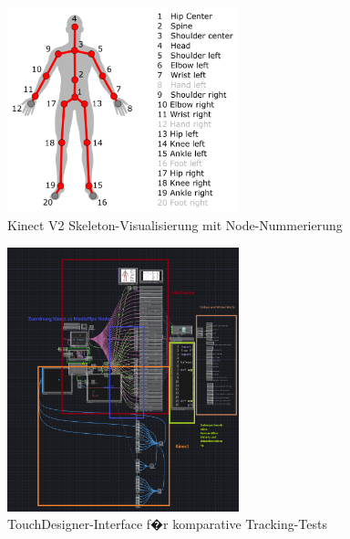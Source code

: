 \begin{figure}[!htbp]
    \centering
    \includegraphics[width=0.6\textwidth,height=0.25\textheight,keepaspectratio]{images/kinect_nodes.png}
    \caption{Kinect V2 Skeleton-Visualisierung mit Node-Nummerierung}
    \label{fig:kinect_nodes}
\end{figure}

\begin{figure}[!htbp]
    \centering
    \includegraphics[width=0.6\textwidth,height=0.25\textheight,keepaspectratio]{images/docupictures/KinectMediaPipe_Testing.png}
    \caption{TouchDesigner-Interface f�r komparative Tracking-Tests}
    \label{fig:testing_interface}
\end{figure}

